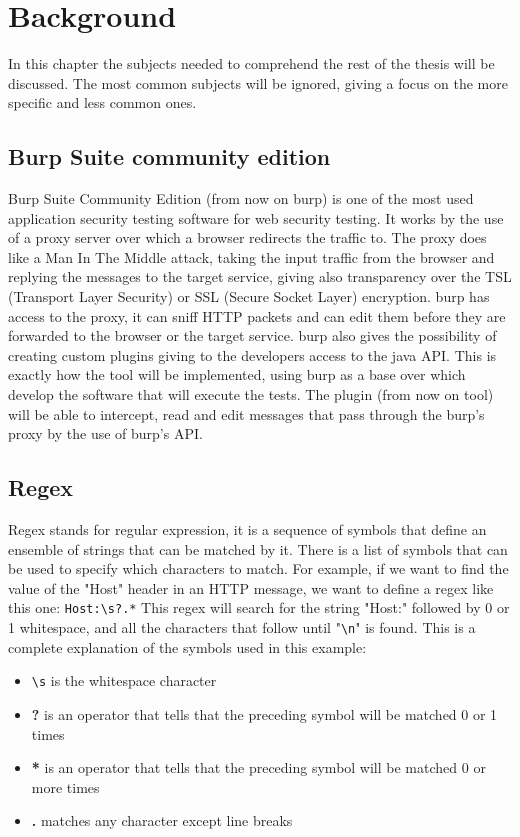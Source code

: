 \chapter{Background}
\label{chap:Background}
In this chapter the subjects needed to comprehend the rest of the thesis will be discussed. The most common subjects will be ignored, giving a focus on the more specific and less common ones.

\section{Burp Suite community edition}
Burp Suite Community Edition (from now on \Gls{burp}) is one of the most used application security testing software for web security testing. It works by the use of a proxy server over which a browser redirects the traffic to. The proxy does like a Man In The Middle attack, taking the input traffic from the browser and replying the messages to the target service, giving also transparency over the TSL (Transport Layer Security) or SSL (Secure Socket Layer) encryption. \Gls{burp} has access to the proxy, it can sniff HTTP packets and can edit them before they are forwarded to the browser or the target service. \Gls{burp} also gives the possibility of creating custom plugins giving to the developers access to the java API. This is exactly how the tool will be implemented, using \Gls{burp} as a base over which develop the software that will execute the tests. The plugin (from now on tool) will be able to intercept, read and edit messages that pass through the \Gls{burp}'s proxy by the use of \Gls{burp}'s API.

\section{Regex}
Regex stands for regular expression, it is a sequence of symbols that define an ensemble of strings that can be matched by it. There is a list of symbols that can be used to specify which characters to match. For example, if we want to find the value of the "Host" header in an HTTP message, we want to define a regex like this one: \verb|Host:\s?.*|
This regex will search for the string "Host:" followed by 0 or 1 whitespace, and all the characters that follow until "\verb|\n|" is found. This is a complete explanation of the symbols used in this example:
\begin{itemize}
    \item \verb|\s| is the whitespace character
    \item \textbf{?} is an operator that tells that the preceding symbol will be matched 0 or 1 times
    \item \textbf{*} is an operator that tells that the preceding symbol will be matched 0 or more times
    \item \textbf{.} matches any character except line breaks
\end{itemize}

